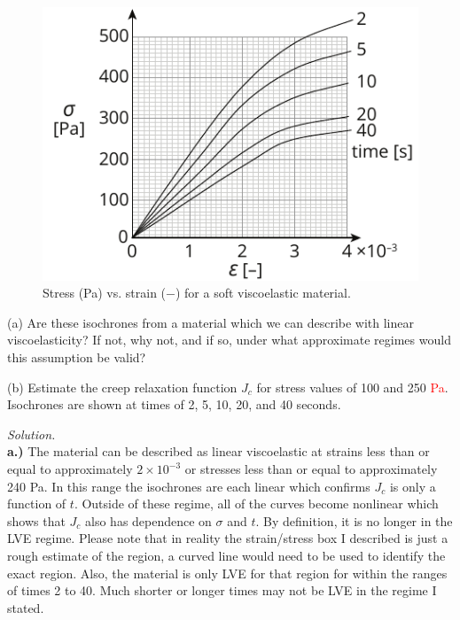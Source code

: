 \begin{figure}[H]
\vspace{-1em}
\centering
\includegraphics[scale = 1.5]{instr-figures/PS2-Q3.pdf}
\caption{\small{Stress (Pa) vs. strain ($-$) for a soft viscoelastic material.}}
\end{figure}

\vspace{-1em}
(a) Are these isochrones from a material which we can describe with linear viscoelasticity? If not, why not, and if so, under what approximate regimes would this assumption be valid? 

\medskip
(b) Estimate the creep relaxation function $J_c$ for stress values of 100 and 250 \textcolor{red}{Pa}. Isochrones are shown at times of 2, 5, 10, 20, and 40 seconds.   

\bigskip

\textit{Solution.}\\

\textbf{a.)} The material can be described as linear viscoelastic at strains less than or equal to approximately $2\times10^{-3}$ or stresses less than or equal to approximately 240 Pa. In this range the isochrones are each linear which confirms $J_c$ is only a function of $t$. Outside of these regime, all of the curves become nonlinear which shows that $J_c$ also has dependence on $\sigma$ and $t$. By definition, it is no longer in the LVE regime. Please note that in reality the strain/stress box I described is just a rough estimate of the region, a curved line would need to be used to identify the exact region. Also, the material is only LVE for that region for within the ranges of times 2 to 40. Much shorter or longer times may not be LVE in the regime I stated.

